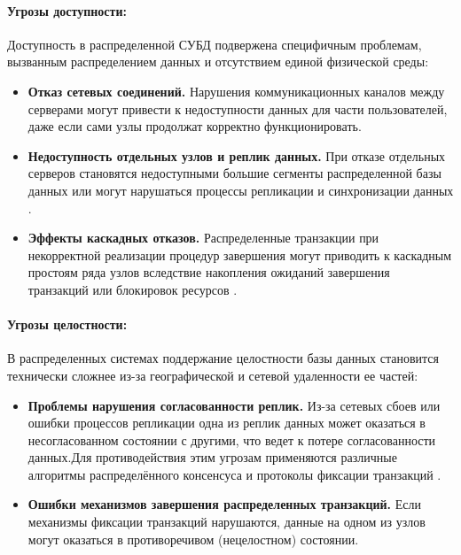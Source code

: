 \paragraph{Угрозы доступности:}

Доступность в распределенной СУБД подвержена специфичным проблемам, вызванным распределением данных и отсутствием единой физической среды:

\begin{itemize} 
    \item \textbf{Отказ сетевых соединений.} Нарушения коммуникационных каналов между серверами могут привести к недоступности данных для части пользователей, даже если сами узлы продолжат корректно функционировать\autocite{Karpova2009}.
    \item \textbf{Недоступность отдельных узлов и реплик данных.} При отказе отдельных серверов становятся недоступными большие сегменты распределенной базы данных или могут нарушаться процессы репликации и синхронизации данных \autocite{Tanenbaum}. 
    \item \textbf{Эффекты каскадных отказов.} Распределенные транзакции при некорректной реализации процедур завершения могут приводить к каскадным простоям ряда узлов вследствие накопления ожиданий завершения транзакций или блокировок ресурсов \autocite{IntroBD2014}. 
\end{itemize}

\paragraph{Угрозы целостности:}

В распределенных системах поддержание целостности базы данных становится технически сложнее из-за географической и сетевой удаленности ее частей:

\begin{itemize} 
    \item \textbf{Проблемы нарушения согласованности реплик.} Из-за сетевых сбоев или ошибки процессов репликации одна из реплик данных может оказаться в несогласованном состоянии с другими, что ведет к потере согласованности данных.Для противодействия этим угрозам применяются различные алгоритмы распределённого консенсуса и 
    протоколы фиксации транзакций \autocite{Tanenbaum}.
    \item \textbf{Ошибки механизмов завершения распределенных транзакций.} Если механизмы фиксации транзакций нарушаются, данные на одном из узлов могут оказаться в противоречивом (нецелостном) состоянии. 
\end{itemize}


